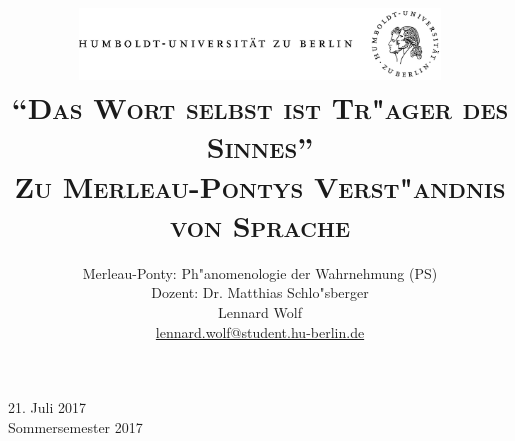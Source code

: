 \documentclass[a4paper, 12pt]{article}
\date{\vspace{-3ex}}
\begin{document}
\title{\vspace{5ex}
	\includegraphics*[bb=0 0 720 200, width=0.72\textwidth]{ErstesSem/images/hu_logo.png}\\
	\vspace{30pt}
	\scshape\LARGE{"`Das Wort selbst ist Tr"ager des Sinnes"'}\\\Large{Zu Merleau-Pontys Verst"andnis von Sprache}\\\vspace{20pt}}
	


\author{Merleau-Ponty: Ph"anomenologie der Wahrnehmung (PS)\\
	\vspace{6pt}
          Dozent: Dr. Matthias Schlo"sberger\\\vspace{4pt}Lennard Wolf\\
        \small{\href{mailto:lennard.wolf@student.hu-berlin.de}{lennard.wolf@student.hu-berlin.de}}}      

\maketitle

\vspace{\fill}

\begin{minipage}[b]{\textwidth}
    \centering
    \onehalfspacing
    \large   
    21. Juli 2017\\
    Sommersemester 2017

    \vspace{-20mm} 
\end{minipage}%
\thispagestyle{empty}
\newpage
\setcounter{page}{1}
\end{document}
